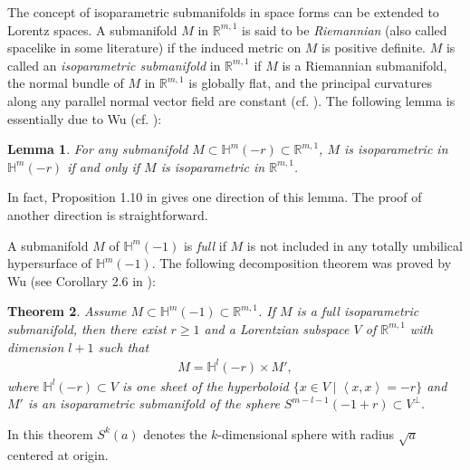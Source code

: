 \documentclass[12pt]{article}
\newtheorem{lem}{Lemma}[section]
\newtheorem{defi}[lem]{Definition}
\newtheorem{thm}[lem]{Theorem}
\begin{document}
The concept of isoparametric submanifolds in space forms can be extended to Lorentz spaces.	
 A submanifold $M$ in $\mathbb R^{m,1}$ is said to be {\it Riemannian} (also called spacelike in some literature) if the induced metric on $M$ is positive definite.
$M$ is called  an {\it isoparametric submanifold} in $\mathbb R^{m,1}$ if $M$ is a Riemannian submanifold, the normal bundle of $M$ in $\mathbb R^{m,1}$ is globally  flat, and the principal curvatures along any parallel normal vector field are constant (cf.  \cite{W.B}).
The following lemma is essentially due to Wu (cf. \cite{B.W}):
\begin{lem} \label{1.15}
 For any submanifold $M \subset \mathbb{H}^{m}(-r)\subset \mathbb R^{m,1} $,
	$M$ is isoparametric in  $\mathbb{H}^{m}(-r)$ if and only if $M$ is isoparametric in $\mathbb R^{m,1}$.
\end{lem}

\noindent
In fact, Proposition 1.10 in \cite{B.W} gives one direction of this lemma. The proof of another direction is straightforward.


A submanifold $M$ of $\mathbb{H}^{m}(-1)$  is {\it full} if $M$ is not included in any totally umbilical hypersurface of $\mathbb{H}^{m}(-1)$.
The following decomposition theorem was proved by Wu (see Corollary 2.6 in \cite{B.W}):
\begin{thm} \label{thm:Decomp}
	Assume  $M \subset \mathbb{H}^{m}(-1)\subset \mathbb R^{m,1}$. If $M$ is a full isoparametric submanifold,
then there exist $r \geq 1 $ and a  Lorentzian subspace $V$ of $\mathbb R^{m,1}$ with dimension $l+1$ such that
	\begin{align*}
		M=\mathbb{H}^{l}(- r)\times M',
	\end{align*}
	where $\mathbb{H}^l(- r) \subset V$ is one sheet of the hyperboloid
	$\{ x \in V \mid \left<x,x\right>=- r \}$
  and $M'$ is an isoparametric submanifold of the sphere $S^{m-l-1}(-1+r) \subset V^{\perp}$.
\end{thm}


\noindent
In this theorem $S^k(a)$ denotes the $k$-dimensional sphere with radius $\sqrt{a}$ centered at origin.
	
\end{document}
